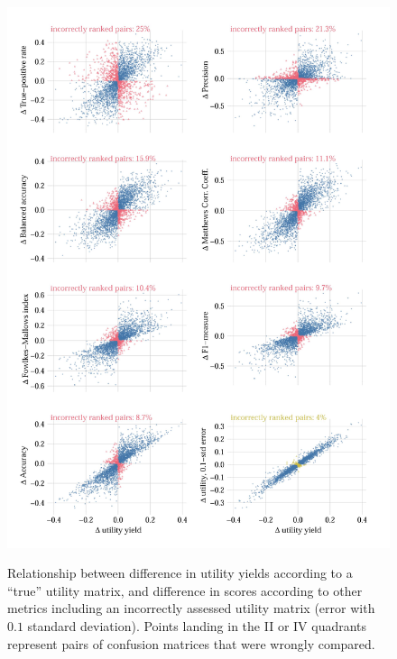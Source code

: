 \documentclass[\ifafour a4paper,12pt,\else a5paper,10pt,\fi%
onecolumn,oneside,article,%
british%
]{memoir}
\theoremstyle{remark}
\theoremstyle{innote}
\renewcommand*{\|}[1][]{\nonscript\:#1\vert\nonscript\:\mathopen{}}
\begin{document}
\begin{figure}[p]
  \centering
    \includegraphics[width=\linewidth]{incorrectscores4unif-11.jpg}\\
  \caption{Relationship between difference in utility yields according to a \enquote{true} utility matrix, and difference in scores according to other metrics including an incorrectly assessed utility matrix (error with $0.1$ standard deviation). Points landing in the II or IV quadrants represent pairs of confusion matrices that were wrongly compared.}
  \label{fig:wrongly_ranked_pairs}
\end{figure}
\end{document}
